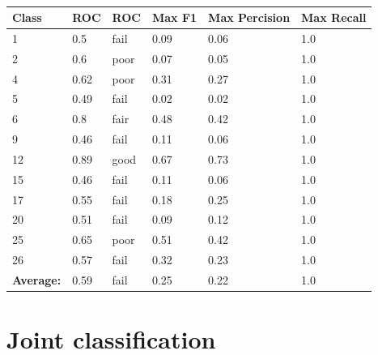 \begin{table}[!h]
\centering
{\small
\begin{tabular}{llllll}
\hline
\textbf{Class}    & \textbf{ROC} & \textbf{ROC} & \textbf{Max F1} & \textbf{Max Percision} & \textbf{Max Recall} \\ \hline
1                 & 0.5          & fail         & 0.09            & 0.06                   & 1.0                 \\
2                 & 0.6          & poor         & 0.07            & 0.05                   & 1.0                 \\
4                 & 0.62         & poor         & 0.31            & 0.27                   & 1.0                 \\
5                 & 0.49         & fail         & 0.02            & 0.02                   & 1.0                 \\
6                 & 0.8          & fair         & 0.48            & 0.42                   & 1.0                 \\
9                 & 0.46         & fail         & 0.11            & 0.06                   & 1.0                 \\
12                & 0.89         & good         & 0.67            & 0.73                   & 1.0                 \\
15                & 0.46         & fail         & 0.11            & 0.06                   & 1.0                 \\
17                & 0.55         & fail         & 0.18            & 0.25                   & 1.0                 \\
20                & 0.51         & fail         & 0.09            & 0.12                   & 1.0                 \\
25                & 0.65         & poor         & 0.51            & 0.42                   & 1.0                 \\
26                & 0.57         & fail         & 0.32            & 0.23                   & 1.0                 \\ \hline
\textbf{Average:} & 0.59         & fail         & 0.25            & 0.22                   & 1.0                 \\ \hline
\end{tabular} }
\caption{}
\label{my-label}
\end{table}


\newpage
%
%
%
%
\section{Joint classification}


